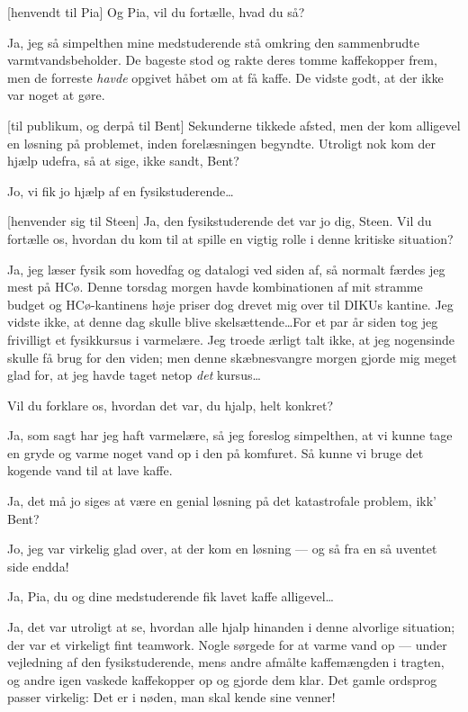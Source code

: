 \documentclass[a4paper,11pt]{article}
\begin{document}
\begin{sketch}
[henvendt til Pia]
     Og Pia, vil du fortælle, hvad du så?

     Ja, jeg så simpelthen mine medstuderende stå omkring
     den sammenbrudte varmtvandsbeholder. De bageste stod og
     rakte deres tomme kaffekopper frem, men de forreste
     {\em havde}\/ opgivet håbet om at få kaffe. De vidste godt, at
     der ikke var noget at gøre.

[til publikum, og derpå til Bent]
     Sekunderne tikkede afsted, men der kom alligevel en
     løsning på problemet, inden forelæsningen begyndte.
     Utroligt nok kom der hjælp udefra, så at sige, ikke
     sandt, Bent?

 Jo, vi fik jo hjælp af en fysikstuderende\dots

[henvender sig til Steen]
     Ja, den fysikstuderende det var jo dig, Steen. Vil du
     fortælle os, hvordan du kom til at spille en vigtig
     rolle i denne kritiske situation?

     Ja, jeg læser fysik som hovedfag og datalogi ved siden
     af, så normalt færdes jeg mest på HCø. Denne torsdag
     morgen havde kombinationen af mit stramme budget og
     HCø-kantinens høje priser dog drevet mig over til
     DIKUs kantine. Jeg vidste ikke, at denne dag skulle
     blive skelsættende\dots For et par år siden tog jeg
     frivilligt et fysikkursus i varmelære. Jeg troede
     ærligt talt ikke, at jeg nogensinde skulle få brug for
     den viden; men denne skæbnesvangre morgen gjorde mig
     meget glad for, at jeg havde taget netop {\em det}\/ kursus\dots

     Vil du forklare os, hvordan det var, du hjalp, helt
     konkret?

     Ja, som sagt har jeg haft varmelære, så jeg foreslog
     simpelthen, at vi kunne tage en gryde og varme noget
     vand op i den på komfuret. Så kunne vi bruge det
     kogende vand til at lave kaffe.

     Ja, det må jo siges at være en genial løsning på
     det katastrofale problem, ikk' Bent?

     Jo, jeg var virkelig glad over, at der kom en
     løsning --- og så fra en så uventet side endda!

     Ja, Pia, du og dine medstuderende fik lavet kaffe
     alligevel\dots 

     Ja, det var utroligt at se, hvordan alle hjalp hinanden
     i denne alvorlige situation; der var et virkeligt fint
     teamwork. Nogle sørgede for at varme vand op --- under
     vejledning af den fysikstuderende, mens andre afmålte
     kaffemængden i tragten, og andre igen vaskede
     kaffekopper op og gjorde dem klar. Det gamle ordsprog
     passer virkelig: Det er i nøden, man skal kende sine
     venner!


\end{sketch}
\end{document}
